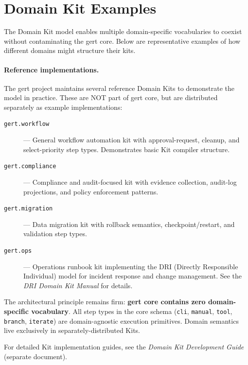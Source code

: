 \section{Domain Kit Examples}
\label{sec:kit-examples}

The Domain Kit model enables multiple domain-specific vocabularies to coexist
without contaminating the gert core. Below are representative examples of how
different domains might structure their kits.

\paragraph{Reference implementations.}
The gert project maintains several reference Domain Kits to demonstrate the
model in practice. These are NOT part of gert core, but are distributed
separately as example implementations:

\begin{description}
  \item[\texttt{gert.workflow}] --- General workflow automation kit with
    approval-request, cleanup, and select-priority step types. Demonstrates
    basic Kit compiler structure.
  
  \item[\texttt{gert.compliance}] --- Compliance and audit-focused kit with
    evidence collection, audit-log projections, and policy enforcement patterns.
    
  \item[\texttt{gert.migration}] --- Data migration kit with rollback semantics,
    checkpoint/restart, and validation step types.
    
  \item[\texttt{gert.ops}] --- Operations runbook kit implementing the DRI
    (Directly Responsible Individual) model for incident response and change
    management. See the \emph{DRI Domain Kit Manual} for details.
\end{description}

The architectural principle remains firm: \textbf{gert core contains zero
domain-specific vocabulary}. All step types in the core schema (\texttt{cli},
\texttt{manual}, \texttt{tool}, \texttt{branch}, \texttt{iterate}) are
domain-agnostic execution primitives. Domain semantics live exclusively in
separately-distributed Kits.

For detailed Kit implementation guides, see the \emph{Domain Kit Development
Guide} (separate document).

